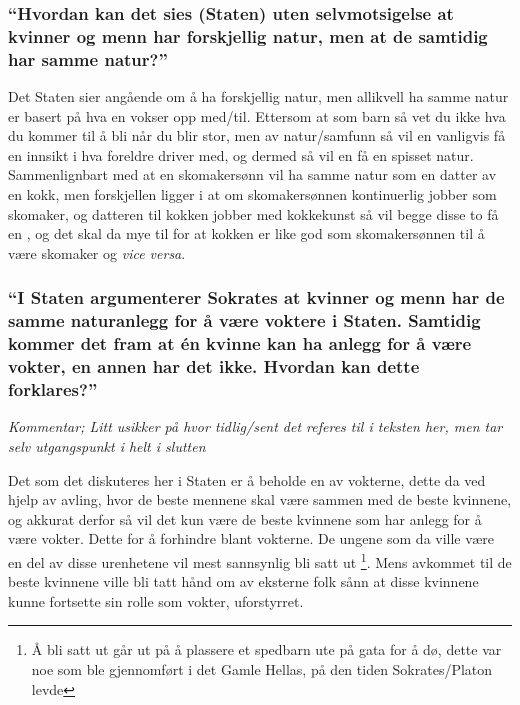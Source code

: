 \documentclass[a4paper]{IEEEtran}
\begin{document}
        \subsubsection{``Hvordan kan det sies (Staten) uten selvmotsigelse at kvinner 
        og menn har forskjellig natur, men at de samtidig har samme natur?''}
        Det Staten sier angående om å ha forskjellig natur, men allikvell ha samme natur 
        er basert på hva en vokser opp med/til. Ettersom at som barn så vet du ikke hva
        du kommer til å bli når du blir stor, men av natur/samfunn så vil en vanligvis
        få en innsikt i hva foreldre driver med, og dermed så vil en få en spisset natur.
        Sammenlignbart med at en skomakersønn vil ha samme natur som en datter av en kokk,
        men forskjellen ligger i at om skomakersønnen kontinuerlig jobber som skomaker,
        og datteren til kokken jobber med kokkekunst så vil begge disse to få en 
        , og det skal da mye til for at kokken er like god 
        som skomakersønnen til å være skomaker og \textit{vice versa}. \medskip

        \subsubsection{``I Staten argumenterer Sokrates at kvinner og menn har de samme 
        naturanlegg for å være voktere i Staten. Samtidig kommer det fram at én 
        kvinne kan ha anlegg for å være vokter, en annen har det ikke. Hvordan 
        kan dette forklares?''}
        \textit{Kommentar; Litt usikker på hvor tidlig/sent det referes til i teksten her,
        men tar selv utgangspunkt i helt i slutten}

        Det som det diskuteres her i Staten er å beholde en  av 
        vokterne, dette da ved hjelp av avling, hvor de beste mennene skal være 
        sammen med de beste kvinnene, og akkurat derfor så vil det kun være 
        de beste kvinnene som har anlegg for å være vokter. Dette for å forhindre
         blant vokterne. De ungene som da ville være en 
        del av disse urenhetene vil mest sannsynlig bli satt ut 
        \footnote{Å bli satt ut går ut på å plassere et spedbarn ute på gata for å dø,
        dette var noe som ble gjennomført i det Gamle Hellas, på den tiden 
        Sokrates/Platon levde}. Mens avkommet til de beste kvinnene ville bli 
        tatt hånd om av eksterne folk sånn at disse kvinnene kunne fortsette 
        sin rolle som vokter, uforstyrret. \medskip  
\end{document}
